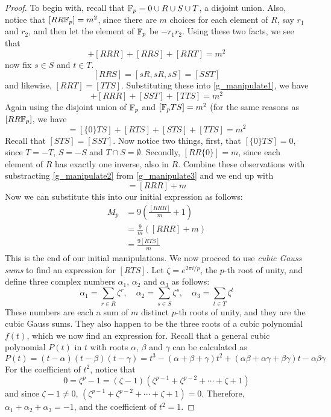 \begin{proof}
To begin with, recall that $\mathbb{F}_p = {0} \cup R \cup S \cup T$, a disjoint union.
Also, notice that $[RR\mathbb{F}_p] = m^2$, since there are $m$ choices for each element of $R$, say $r_1$ and $r_2$, and then let the element of $\mathbb{F}_p$ be $-r_1r_2$.
Using these two facts, we see that
\begin{equation}
	[RR\{0\}] + [RRR] + [RRS] + [RRT] = m^2 \label{g_manipulate1}
\end{equation}
now fix $s \in S$ and $t \in T$.
$$[RRS] = [sR, sR, sS] = [SST]$$
and likewise, $[RRT] = [TTS]$.
Substituting these into \eqref{g_manipulate1}, we have
\begin{equation}
	[RR\{0\}] +[RRR] + [SST] + [TTS] = m^2 \label{g_manipulate2}
\end{equation}
Again using the disjoint union of $\mathbb{F}_p$ and $[\mathbb{F}_p TS] = m^2$ (for the same reasons as $[RR\mathbb{F}_p]$, we have
\begin{equation}
	[\fp TS] = [\{0\}TS] + [RTS] + [STS] + [TTS] = m^2 \label{g_manipulate3}
\end{equation}
Recall that $[STS] = [SST]$.
Now notice two things, first, that $[\{0\}TS] = 0$, since $T = -T$, $S = -S$ and $T \cap S = \emptyset$.
Secondly, $[RR\{0\}] = m$, since each element of $R$ has exactly one inverse, also in $R$.
Combine these observations with substracting \eqref{g_manipulate2} from \eqref{g_manipulate3} and we end up with
\begin{equation*}
	[RTS] = [RRR] + m
\end{equation*}
Now we can substitute this into our initial expression as follows:
\begin{align*}
	M_p &= 9\left(\frac{[RRR]}{m}+1\right)\\
	    &= \frac{9}{m}\left([RRR] + m\right)\\
	    &= \frac{9[RTS]}{m}
\end{align*}
This is the end of our initial manipulations.
We now proceed to use \emph{cubic Gauss sums} to find an expression for $[RTS]$.
Let $\zeta = e^{2\pi i/p}$, the $p$-th root of unity, and define three complex numbers $\alpha_1$, $\alpha_2$ and $\alpha_3$ as follows:
$$\alpha_1 = \sum_{r\in R} \zeta^r,\quad \alpha_2 = \sum_{s\in S} \zeta^s,\quad \alpha_3 = \sum_{t\in T} \zeta^t$$
These numbers are each a sum of $m$ distinct $p$-th roots of unity, and they are the cubic Gauss sums.
They also happen to be the three roots of a cubic polynomial $f(t)$, which we now find an expression for.
Recall that a general cubic polynomial $P(t)$ in $t$ with roots $\alpha$, $\beta$ and $\gamma$ can be calculated as
$$ P(t) = (t-\alpha)(t-\beta)(t-\gamma) = t^3 - (\alpha + \beta + \gamma)t^2 + (\alpha \beta + \alpha \gamma + \beta \gamma)t - \alpha \beta \gamma $$
For the coefficient of $t^2$, notice that
$$ 0 = \zeta^p -1 = (\zeta - 1)(\zeta^{p-1}+\zeta^{p-2}+\cdots+\zeta+1) $$
and since $\zeta-1 \neq 0$, $(\zeta^{p-1}+\zeta^{p-2}+\cdots+\zeta+1) = 0$.
Therefore, $\alpha_1 + \alpha_2 + \alpha_3 = -1$, and the coefficient of $t^2 = 1$.


\end{proof}
